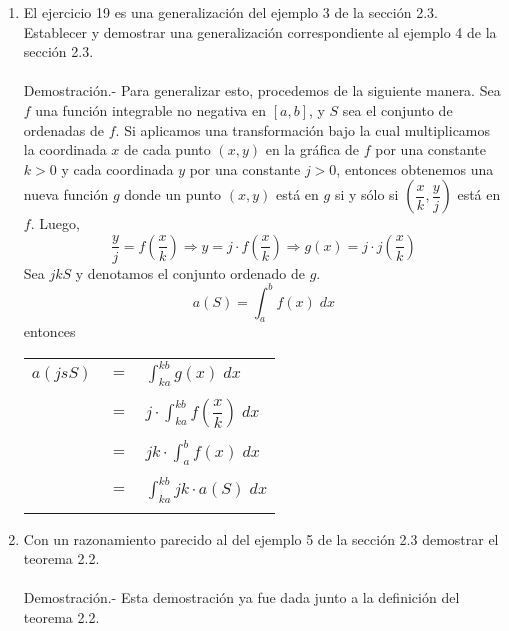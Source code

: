 \begin{enumerate}
\begin{enumerate}[\bfseries a)]
\end{enumerate}

\item El ejercicio 19 es una generalización del ejemplo 3 de la sección 2.3. Establecer y demostrar una generalización correspondiente al ejemplo 4 de la sección 2.3.\\\\
    Demostración.-\; Para generalizar esto, procedemos de la siguiente manera. Sea $f$ una función integrable no negativa en $[a, b]$, y $S$ sea el conjunto de ordenadas de $f$. Si aplicamos una transformación bajo la cual multiplicamos la coordinada $x$ de cada punto $(x, y)$ en la gráfica de $f$ por una constante $k> 0$ y cada coordinada $y$ por una constante $j>0$, entonces obtenemos una nueva función $g$ donde un punto $(x, y)$ está en $g$ si  y sólo si $ \left(\dfrac{x}{k}, \dfrac{y}{j}\right)$ está en $f$. Luego,
    $$\dfrac{y}{j} = f\left(\dfrac{x}{k}\right) \Longrightarrow y = j\cdot f\left(\dfrac{x}{k}\right) \Longrightarrow g(x)=j\cdot j\left(\dfrac{x}{k}\right)$$
    Sea $jkS$ y denotamos el conjunto ordenado de $g$.
    $$ a(S) = \int_a^b f(x)\; dx$$
    entonces 
    \begin{center}
	\begin{tabular}{rcl}
	    $a(jsS)$&$=$&$\displaystyle\int_{ka}^{kb} g(x) \; dx$\\\\
	    &$=$&$j\cdot \displaystyle\int_{ka}^{kb} f\left(\dfrac{x}{k}\right) \; dx$\\\\
	    &$=$&$jk\cdot \displaystyle\int_{a}^{b} f(x) \; dx$\\\\
	    &$=$&$\displaystyle\int_{ka}^{kb} jk\cdot a(S) \; dx$\\\\

	\end{tabular}
    \end{center}

\item Con un razonamiento parecido al del ejemplo 5 de la sección 2.3 demostrar el teorema 2.2.\\\\
    Demostración.-\; Esta demostración ya fue dada junto a la definición del teorema 2.2.\\\\

\end{enumerate}


